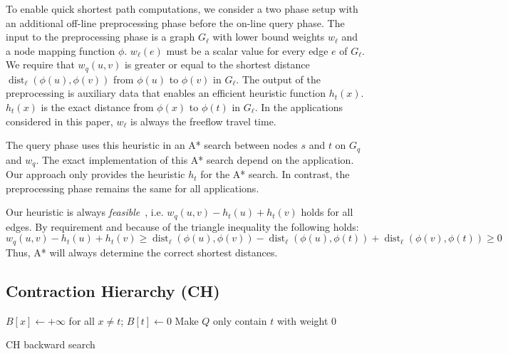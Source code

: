 \documentclass[a4paper,USenglish,cleveref, autoref, thm-restate]{lipics-v2019}
\begin{document}
To enable quick shortest path computations, we consider a two phase setup with an additional off-line preprocessing phase before the on-line query phase.
The input to the preprocessing phase is a graph $G_\ell$ with lower bound weights $w_\ell$ and a node mapping function $\phi$.
$w_\ell(e)$ must be a scalar value for every edge $e$ of $G_\ell$.
We require that $w_q(u,v)$ is greater or equal to the shortest distance $\operatorname{dist}_\ell(\phi(u), \phi(v))$ from $\phi(u)$ to $\phi(v)$ in $G_\ell$. %
The output of the preprocessing is auxiliary data that enables an efficient heuristic function $h_t(x)$.
$h_t(x)$ is the exact distance from $\phi(x)$ to $\phi(t)$ in $G_\ell$.
In the applications considered in this paper, $w_\ell$ is always the freeflow travel time.

The query phase uses this heuristic in an A* search between nodes $s$ and $t$ on $G_q$ and $w_q$.
The exact implementation of this A* search depend on the application.
Our approach only provides the heuristic $h_t$ for the A* search.
In contrast, the preprocessing phase remains the same for all applications.

Our heuristic is always \emph{feasible}~\cite{hnr-afbhd-68}, i.e. $w_q(u,v) - h_t(u) + h_t(v)$ holds for all edges.
By requirement and because of the triangle inequality the following holds:
\[
w_q(u,v) - h_t(u) + h_t(v) \geq \operatorname{dist}_\ell(\phi(u), \phi(v)) - \operatorname{dist}_\ell(\phi(u), \phi(t)) + \operatorname{dist}_\ell(\phi(v), \phi(t)) \geq 0
\]
Thus, A* will always determine the correct shortest distances.

\subsection{Contraction Hierarchy (CH)}

\begin{algorithm2e}
$B[x] \leftarrow +\infty$ for all $x\neq t$;
$B[t] \leftarrow 0$\;
Make $Q$ only contain $t$ with weight $0$\;
\caption{CH backward search}
\label{algo:ch-backward}
\end{algorithm2e}
\end{document}
